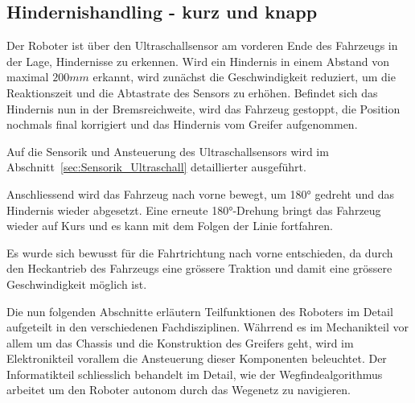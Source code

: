 \documentclass[main.tex]{subfiles} %
\begin{document}

\subsection{Hindernishandling - kurz und knapp}

Der Roboter ist über den Ultraschallsensor am vorderen Ende des Fahrzeugs in
der Lage, Hindernisse zu erkennen. Wird ein Hindernis in einem Abstand von
maximal $200 mm$ erkannt, wird zunächst die Geschwindigkeit reduziert, um die
Reaktionszeit und die Abtastrate des Sensors zu erhöhen. Befindet sich das
Hindernis nun in der Bremsreichweite, wird das Fahrzeug gestoppt, die Position
nochmals final korrigiert und das Hindernis vom Greifer aufgenommen.

Auf die Sensorik und Ansteuerung des Ultraschallsensors wird im
Abschnitt~\ref{sec:Sensorik_Ultraschall} detaillierter ausgeführt.

Anschliessend wird das Fahrzeug nach vorne bewegt, um 180° gedreht und das
Hindernis wieder abgesetzt. Eine erneute 180°-Drehung bringt das Fahrzeug
wieder auf Kurs und es kann mit dem Folgen der Linie fortfahren.

Es wurde sich bewusst für die Fahrtrichtung nach vorne entschieden, da durch
den Heckantrieb des Fahrzeugs eine grössere Traktion und damit eine grössere
Geschwindigkeit möglich ist.


Die nun folgenden Abschnitte erläutern Teilfunktionen des Roboters im Detail
aufgeteilt in den verschiedenen Fachdisziplinen. Währrend es im Mechanikteil
vor allem um das Chassis und die Konstruktion des Greifers geht, wird im
Elektronikteil vorallem die Ansteuerung dieser Komponenten beleuchtet. Der
Informatikteil schliesslich behandelt im Detail, wie der Wegfindealgorithmus
arbeitet um den Roboter autonom durch das Wegenetz zu navigieren.


\newpage


\newpage


\newpage
\end{document}
